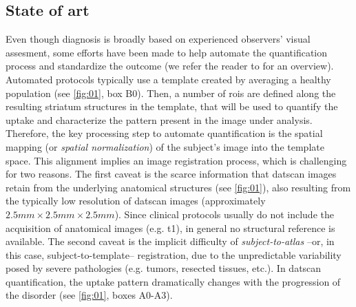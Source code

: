 \documentclass{frontiers}
\begin{document}
\subsection{State of art}\label{sec:state-of-art}
Even though diagnosis is broadly based on experienced observers' visual
  assesment, some efforts have been made to help automate the quantification
  process and standardize the outcome (we refer the reader to
  \citep{badiavas_spect_2011} for an overview).
Automated protocols typically use a template created by averaging a healthy
  population (see \autoref{fig:01}, box B0).
Then, a number of \glspl*{roi} are defined along the resulting striatum 
  structures in the template, that will be used to quantify the uptake and characterize the
  pattern present in the image under analysis.
Therefore, the key processing step to automate quantification is the
  spatial mapping (or \emph{spatial normalization}) of the subject's image into 
  the template space.
This alignment implies an image registration process, which is challenging for two reasons.
The first caveat  is the scarce information that \gls*{datscan} images 
  retain from the underlying anatomical structures (see \autoref{fig:01}),
  also resulting from the typically low resolution of
  \gls*{datscan} images (approximately $2.5mm\times2.5mm\times2.5mm$).
Since clinical protocols usually do not include the acquisition of anatomical images
  (e.g. \gls*{t1}), in general no structural reference is available.
The second caveat is the implicit difficulty of \emph{subject-to-atlas} 
  --or, in this case, subject-to-template-- registration, due to the unpredictable 
  variability posed by severe pathologies (e.g. tumors, resected tissues, etc.).
In \gls*{datscan} quantification, the uptake pattern dramatically changes 
  with the progression of the disorder (see \autoref{fig:01}, boxes A0-A3).
\end{document}
